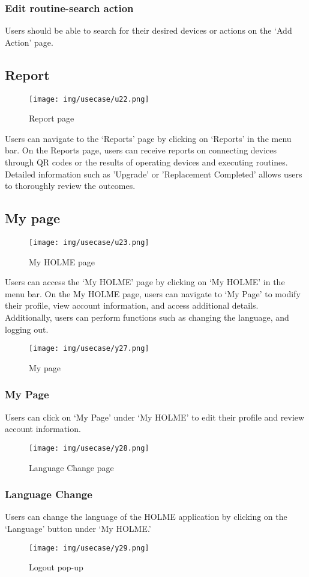 \documentclass[conference]{IEEEtran}
\begin{document}
\subsubsection{Edit routine-search action}
Users should be able to search for their desired devices or actions on the `Add Action' page.
\vspace{1cm}
\subsection{Report}
\begin{figure}[h]
\centering
\texttt{[image: img/usecase/u22.png]}
\caption{Report page}
\end{figure}
Users can navigate to the `Reports' page by clicking on `Reports' in the menu bar. On the Reports page, users can receive reports on connecting devices through QR codes or the results of operating devices and executing routines. Detailed information such as 'Upgrade' or 'Replacement Completed' allows users to thoroughly review the outcomes.
\clearpage
\subsection{My page}
\begin{figure}[h]
\centering
\texttt{[image: img/usecase/u23.png]}
\caption{My HOLME page}
\end{figure}
Users can access the `My HOLME' page by clicking on `My HOLME' in the menu bar. On the My HOLME page, users can navigate to `My Page' to modify their profile, view account information, and access additional details. Additionally, users can perform functions such as changing the language, and logging out.
\vspace{1cm}
\begin{figure}[h!]
\centering
\texttt{[image: img/usecase/y27.png]}
\caption{My page}
\end{figure}
\subsubsection{My Page}
Users can click on `My Page' under `My HOLME' to edit their profile and review account information.
\vspace{2cm}
\begin{figure}[h!]
\centering
\texttt{[image: img/usecase/y28.png]}
\caption{Language Change page}
\end{figure}
\subsubsection{Language Change}
Users can change the language of the HOLME application by clicking on the `Language' button under `My HOLME.'
\vspace{2cm}
\begin{figure}[h!]
\centering
\texttt{[image: img/usecase/y29.png]}
\caption{Logout pop-up}
\end{figure}
\end{document}
